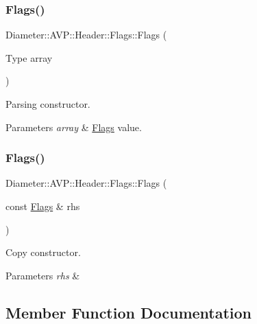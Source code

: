 \subsubsection{\texorpdfstring{Flags()}{Flags()}\hspace{0.1cm}{\footnotesize\ttfamily [1/2]}}
{\footnotesize\ttfamily Diameter\+::\+A\+V\+P\+::\+Header\+::\+Flags\+::\+Flags (\begin{DoxyParamCaption}\item[{Type}]{array }\end{DoxyParamCaption})\hspace{0.3cm}{\ttfamily [explicit]}}



Parsing constructor. 


\begin{DoxyParams}{Parameters}
{\em array} & \hyperlink{classDiameter_1_1AVP_1_1Header_1_1Flags}{Flags} value. \\
\hline
\end{DoxyParams}
\mbox{\label{classDiameter_1_1AVP_1_1Header_1_1Flags_a501b8e6b0e513f98614a4defde2b9e06}} 
\subsubsection{\texorpdfstring{Flags()}{Flags()}\hspace{0.1cm}{\footnotesize\ttfamily [2/2]}}
{\footnotesize\ttfamily Diameter\+::\+A\+V\+P\+::\+Header\+::\+Flags\+::\+Flags (\begin{DoxyParamCaption}\item[{const \hyperlink{classDiameter_1_1AVP_1_1Header_1_1Flags}{Flags} \&}]{rhs }\end{DoxyParamCaption})}



Copy constructor. 


\begin{DoxyParams}{Parameters}
{\em rhs} & \\
\hline
\end{DoxyParams}


\subsection{Member Function Documentation}
\mbox{\label{classDiameter_1_1AVP_1_1Header_1_1Flags_aad359a4a25b2998c813c0923e67efeb8}} 
